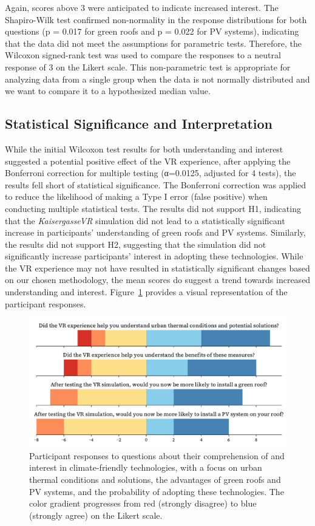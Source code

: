 \documentclass[draft, final]{vutinfth} %
\begin{document}
Again, scores above 3 were anticipated to indicate increased interest. The Shapiro-Wilk test confirmed non-normality in the response distributions for both questions (p = 0.017 for green roofs and p = 0.022 for PV systems), indicating that the data did not meet the assumptions for parametric tests. Therefore, the Wilcoxon signed-rank test was used to compare the responses to a neutral response of 3 on the Likert scale. This non-parametric test is appropriate for analyzing data from a single group when the data is not normally distributed and we want to compare it to a hypothesized median value.

\subsection{Statistical Significance and Interpretation}

While the initial Wilcoxon test results for both understanding and interest suggested a potential positive effect of the VR experience, after applying the Bonferroni correction for multiple testing (α=0.0125, adjusted for 4 tests), the results fell short of statistical significance. The Bonferroni correction was applied to reduce the likelihood of making a Type I error (false positive) when conducting multiple statistical tests.  The results did not support H1, indicating that the \textit{KaisergasseVR} simulation did not lead to a statistically significant increase in participants' understanding of green roofs and PV systems. Similarly, the results did not support H2, suggesting that the simulation did not significantly increase participants' interest in adopting these technologies. While the VR experience may not have resulted in statistically significant changes based on our chosen methodology, the mean scores do suggest a trend towards increased understanding and interest.
Figure~\ref{fig:research-1} provides a visual representation of the participant responses.

\begin{figure}[h]
    \centering
    \includegraphics[width=\textwidth]{graphics/research-1.pdf}
    \caption{Participant responses to questions about their comprehension of and interest in climate-friendly technologies, with a focus on urban thermal conditions and solutions, the advantages of green roofs and PV systems, and the probability of adopting these technologies. The color gradient progresses from red (strongly disagree) to blue (strongly agree) on the Likert scale.}
    \label{fig:research-1}
\end{figure}
\end{document}
